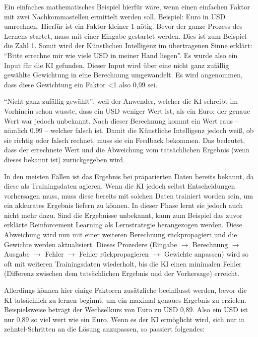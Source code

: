 Ein einfaches mathematisches Beispiel hierfür wäre, wenn einen einfachen Faktor mit zwei Nachkommastellen ermittelt werden soll. Beispiel: Euro in USD umrechnen. Hierfür ist ein Faktor kleiner 1 nötig. Bevor der ganze Prozess des Lernens startet, muss mit einer Eingabe gestartet werden. Dies ist zum Beispiel die Zahl 1. Somit wird der Künstlichen Intelligenz im übertragenen Sinne erklärt: ``Bitte errechne mir wie viele USD in meiner Hand liegen''. Es wurde also ein Input für die KI gefunden. Dieser Input wird über eine nicht ganz zufällig gewählte Gewichtung in eine Berechnung umgewandelt. Es wird angenommen, dass diese Gewichtung ein Faktor <1 also 0,99 sei.

``Nicht ganz zufällig gewählt'', weil der Anwender, welcher die KI schreibt im Vorhinein schon wusste, dass ein USD weniger Wert ist, als ein Euro; der genaue Wert war jedoch unbekannt. Nach dieser Berechnung kommt ein Wert raus – nämlich 0.99 – welcher falsch ist. Damit die Künstliche Intelligenz jedoch weiß, ob sie richtig oder falsch rechnet, muss sie ein Feedback bekommen. Das bedeutet, dass der errechnete Wert und die Abweichung vom tatsächlichen Ergebnis (wenn dieses bekannt ist) zurückgegeben wird.

In den meisten Fällen ist das Ergebnis bei präparierten Daten bereits bekannt, da diese als Trainingsdaten agieren. Wenn die KI jedoch selbst Entscheidungen vorhersagen muss, muss diese bereits mit solchen Daten trainiert worden sein, um ein akkurates Ergebnis liefern zu können. In dieser Phase lernt sie jedoch auch nicht mehr dazu. Sind die Ergebnisse unbekannt, kann zum Beispiel das zuvor erklärte Reinforcement Learning als Lernstrategie herangezogen werden. Diese Abweichung wird nun mit einer weiteren Berechnung rückpropagiert und die Gewichte werden aktualisiert. Dieses Prozedere (Eingabe $\rightarrow$ Berechnung $\rightarrow$ Ausgabe $\rightarrow$ Fehler $\rightarrow$ Fehler rückpropagieren $\rightarrow$ Gewichte anpassen) wird so oft mit weiteren Trainingsdaten wiederholt, bis die KI einen minimalen Fehler (Differenz zwischen dem tatsächlichen Ergebnis und der Vorhersage) erreicht.

Allerdings können hier einige Faktoren zusätzliche beeinflusst werden, bevor die KI tatsächlich zu lernen beginnt, um ein maximal genaues Ergebnis zu erzielen. Beispielsweise beträgt der Wechselkurs von Euro zu USD 0,89. Also ein USD ist nur 0,89 so viel wert wie ein Euro. Wenn es der KI ermöglicht wird, sich nur in zehntel-Schritten an die Lösung anzupassen, so passiert folgendes:

